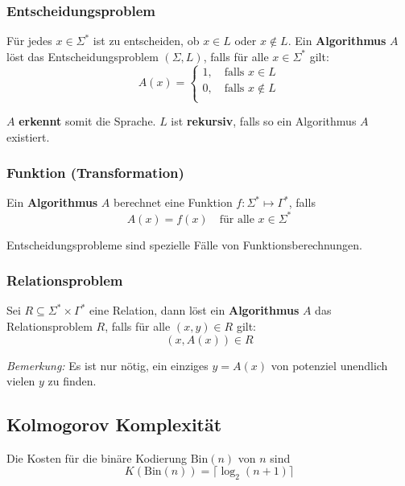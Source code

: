 \documentclass[11pt]{article}
\begin{document}
\subsubsection{Entscheidungsproblem}
F{\"u}r jedes $x \in \Sigma^*$ ist zu entscheiden, ob $x \in L$ oder $x \notin L$. Ein \textbf{Algorithmus} $A$ l{\"o}st das Entscheidungsproblem $(\Sigma, L)$, falls f{\"u}r alle $x \in \Sigma^*$ gilt:
\begin{equation*}
	A(x) = \begin{cases}
		1, \quad\text{falls $x \in L$} \\
		0, \quad\text{falls $x \notin L$} \\
	\end{cases}
\end{equation*}

$A$ \textbf{erkennt} somit die Sprache. $L$ ist \textbf{rekursiv}, falls so ein Algorithmus $A$ existiert.

\subsubsection{Funktion (Transformation)}
Ein \textbf{Algorithmus} $A$ berechnet eine Funktion $f: \Sigma^* \mapsto \Gamma^*$, falls
\begin{equation*}
	A(x) = f(x) \quad\text{f{\"u}r alle $x \in \Sigma^*$}
\end{equation*}

Entscheidungsprobleme sind spezielle F{\"a}lle von Funktionsberechnungen.

\subsubsection{Relationsproblem}
Sei $R \subseteq \Sigma^*\times\Gamma^*$ eine Relation, dann l{\"o}st ein \textbf{Algorithmus} $A$ das Relationsproblem $R$, falls f{\"u}r alle $(x,y) \in R$ gilt:
\begin{equation*}
	(x, A(x)) \in R
\end{equation*}

\emph{Bemerkung:} Es ist nur n{\"o}tig, ein einziges $y = A(x)$ von potenziel unendlich vielen $y$ zu finden.

\subsection{Kolmogorov Komplexität}

Die Kosten für die binäre Kodierung $\text{Bin}(n)$ von $n$ sind
\begin{equation*}
	K(\text{Bin}(n)) = \lceil\log_2(n+1)\rceil
\end{equation*}
\end{document}
